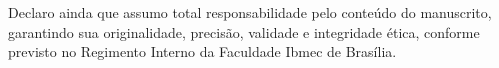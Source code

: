 \begin{singlespace}
\noindent Declaro ainda que assumo total responsabilidade pelo conteúdo do manuscrito, garantindo sua originalidade, precisão, validade e integridade ética,
conforme previsto no Regimento Interno da Faculdade Ibmec de Brasília.
\par\vspace{0.4\baselineskip}

\end{singlespace}

\clearpage
\pagestyle{plain}